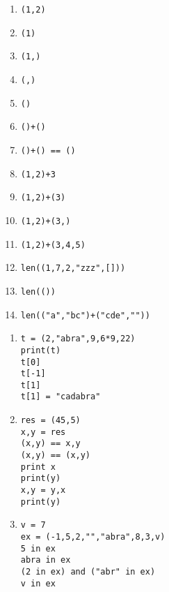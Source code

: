 \exer{}
\setcounter{numques}{0}


\begin{multicols}{2}
  \begin{enumerate}[label=\emph{\alph*)}]
    \item \texttt{(1,2)}
    \item \texttt{(1)}
    \item \texttt{(1,)}
    \item \texttt{(,)}
    \item \texttt{()}
    \item \texttt{()+()}
    \item \texttt{()+() == ()}
    \item \texttt{(1,2)+3}
    \item \texttt{(1,2)+(3)}
    \item \texttt{(1,2)+(3,)}
    \item \texttt{(1,2)+(3,4,5)}
    \item \texttt{len((1,7,2,"zzz",[]))}
    \item \texttt{len(())}
    \item \texttt{len(("a","bc")+("cde",""))}
  \end{enumerate}
\end{multicols}





\begin{enumerate}[label=\emph{\alph*)}]
\item 
\begin{lstlisting}
t = (2,"abra",9,6*9,22)
print(t)
t[0]
t[-1]
t[1]
t[1] = "cadabra" 
\end{lstlisting}
\end{enumerate}
\begin{enumerate}[label=\emph{\alph*)}]
\setcounter{enumi}{1}
\item 
\begin{lstlisting}
res = (45,5)
x,y = res
(x,y) == x,y
(x,y) == (x,y)
print x
print(y)
x,y = y,x
print(y)
\end{lstlisting}
\end{enumerate}
\begin{enumerate}[label=\emph{\alph*)}]
\setcounter{enumi}{2}
\item 
\begin{lstlisting}
v = 7
ex = (-1,5,2,"","abra",8,3,v)
5 in ex
abra in ex
(2 in ex) and ("abr" in ex)
v in ex
\end{lstlisting}
\end{enumerate}

